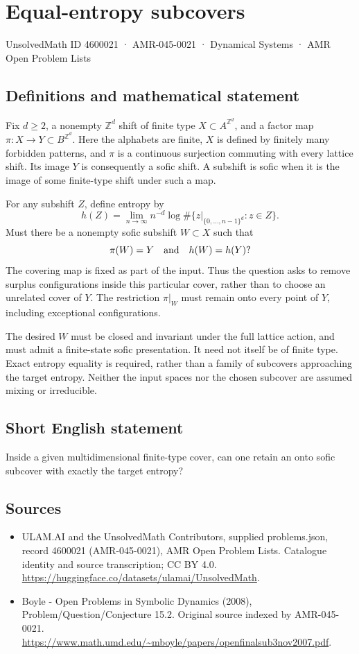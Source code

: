 \documentclass[11pt,a4paper]{article}
\begin{document}
\section*{Equal-entropy subcovers}\label{4600021}
{\small UnsolvedMath ID 4600021 · AMR-045-0021 · Dynamical Systems · AMR Open Problem Lists}
\subsection{Definitions and mathematical statement}
Fix $d\ge2$, a nonempty $\mathbb Z^d$ shift of finite type
$X\subset A^{\mathbb Z^d}$, and a factor map
$\pi:X\to Y\subset B^{\mathbb Z^d}$. Here the alphabets are finite,
$X$ is defined by finitely many forbidden patterns, and $\pi$ is a
continuous surjection commuting with every lattice shift. Its image
$Y$ is consequently a sofic shift. A subshift is sofic when it is the
image of some finite-type shift under such a map.

For any subshift $Z$, define entropy by
\[
 h(Z)=\lim_{n\to\infty}n^{-d}
   \log\#\{z|_{\{0,\ldots,n-1\}^d}:z\in Z\}.
\]
Must there be a nonempty sofic subshift $W\subset X$ such that
\[
                 \pi(W)=Y\quad\hbox{and}\quad h(W)=h(Y)?
\]
The covering map is fixed as part of the input. Thus the question asks
to remove surplus configurations inside this particular cover, rather
than to choose an unrelated cover of $Y$. The restriction $\pi|_W$
must remain onto every point of $Y$, including exceptional configurations.

The desired $W$ must be closed and invariant under the full lattice
action, and must admit a finite-state sofic presentation. It need not
itself be of finite type. Exact entropy equality is required, rather
than a family of subcovers approaching the target entropy. Neither the
input spaces nor the chosen subcover are assumed mixing or irreducible.
\subsection{Short English statement}
Inside a given multidimensional finite-type cover, can one retain an onto sofic subcover with exactly the target entropy?
\subsection{Sources}
\begin{itemize}
\item[S1] ULAM.AI and the UnsolvedMath Contributors, supplied problems.json, record 4600021 (AMR-045-0021), AMR Open Problem Lists. Catalogue identity and source transcription; CC BY 4.0.
\url{https://huggingface.co/datasets/ulamai/UnsolvedMath}.
\item[S2] Boyle - Open Problems in Symbolic Dynamics (2008), Problem/Question/Conjecture 15.2. Original source indexed by AMR-045-0021.
\url{https://www.math.umd.edu/~mboyle/papers/openfinalsub3nov2007.pdf}.
\end{itemize}
\end{document}
